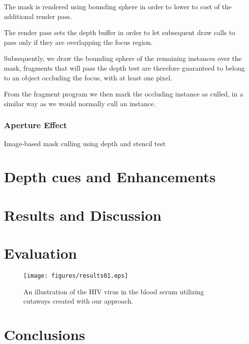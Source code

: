 The mask is rendered using bounding sphere in order to lower to cost of the additional render pass.

The render pass sets the depth buffer in order to let subsequent draw calls to pass only if they are overlapping the focus region.

Subsequently, we draw the bounding sphere of the remaining instances over the mask, fragments that will pass the depth test are therefore guaranteed to belong to an object occluding the focus, with at least one pixel.

From the fragment program we then mark the occluding instance as culled, in a similar way as we would normally cull an instance. 





\subsubsection{Aperture Effect}

Image-based mask culling using depth and stencil test

\section{Depth cues and Enhancements}

\section{Results and Discussion}


\section{Evaluation}

\begin{figure}[t]
 \centering
 \texttt{[image: figures/results01.eps]}
 \caption{\label{fig:results01}An illustration of the HIV virus in the blood serum utilizing cutaways created with our approach.}
\end{figure}

\section{Conclusions}


%







